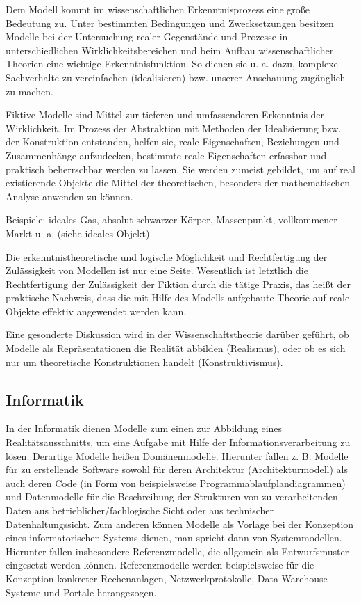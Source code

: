 \documentclass[a4paper, 12pt]{scrartcl}
\begin{document}
Dem Modell kommt im wissenschaftlichen Erkenntnisprozess eine große Bedeutung zu. Unter bestimmten Bedingungen und Zwecksetzungen besitzen Modelle bei der Untersuchung realer Gegenstände und Prozesse in unterschiedlichen Wirklichkeitsbereichen und beim Aufbau wissenschaftlicher Theorien eine wichtige Erkenntnisfunktion. So dienen sie u. a. dazu, komplexe Sachverhalte zu vereinfachen (idealisieren) bzw. unserer Anschauung zugänglich zu machen.

Fiktive Modelle sind Mittel zur tieferen und umfassenderen Erkenntnis der Wirklichkeit. Im Prozess der Abstraktion mit Methoden der Idealisierung bzw. der Konstruktion entstanden, helfen sie, reale Eigenschaften, Beziehungen und Zusammenhänge aufzudecken, bestimmte reale Eigenschaften erfassbar und praktisch beherrschbar werden zu lassen. Sie werden zumeist gebildet, um auf real existierende Objekte die Mittel der theoretischen, besonders der mathematischen Analyse anwenden zu können.

Beispiele: ideales Gas, absolut schwarzer Körper, Massenpunkt, vollkommener Markt u. a. (siehe ideales Objekt)

Die erkenntnistheoretische und logische Möglichkeit und Rechtfertigung der Zulässigkeit von Modellen ist nur eine Seite. Wesentlich ist letztlich die Rechtfertigung der Zulässigkeit der Fiktion durch die tätige Praxis, das heißt der praktische Nachweis, dass die mit Hilfe des Modells aufgebaute Theorie auf reale Objekte effektiv angewendet werden kann.

Eine gesonderte Diskussion wird in der Wissenschaftstheorie darüber geführt, ob Modelle als Repräsentationen die Realität abbilden (Realismus), oder ob es sich nur um theoretische Konstruktionen handelt (Konstruktivismus).

\subsection{Informatik}
In der Informatik dienen Modelle zum einen zur Abbildung eines Realitätsausschnitts, um eine Aufgabe mit Hilfe der Informationsverarbeitung zu lösen. Derartige Modelle heißen Domänenmodelle. Hierunter fallen z. B. Modelle für zu erstellende Software sowohl für deren Architektur (Architekturmodell) als auch deren Code (in Form von beispielsweise Programmablaufplandiagrammen) und Datenmodelle für die Beschreibung der Strukturen von zu verarbeitenden Daten aus betrieblicher/fachlogische Sicht oder aus technischer Datenhaltungssicht. Zum anderen können Modelle als Vorlage bei der Konzeption eines informatorischen Systems dienen, man spricht dann von Systemmodellen. Hierunter fallen insbesondere Referenzmodelle, die allgemein als Entwurfsmuster eingesetzt werden können. Referenzmodelle werden beispielsweise für die Konzeption konkreter Rechenanlagen, Netzwerkprotokolle, Data-Warehouse-Systeme und Portale herangezogen.
\end{document}
